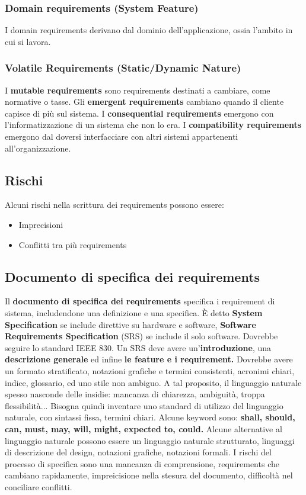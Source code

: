 \documentclass[11pt]{article}
\begin{document}
\subsubsection{Domain requirements (System Feature)}
I \gls{domain} requirements derivano dal dominio dell'applicazione, ossia l'ambito in cui si lavora. 
\subsubsection{Volatile Requirements (Static/Dynamic Nature)}
I \textbf{mutable requirements} sono requirements destinati a cambiare, come normative o tasse. Gli \textbf{emergent requirements} cambiano quando il cliente capisce di più sul sistema. I \textbf{consequential requirements} emergono con l'informatizzazione di un sistema che non lo era. I \textbf{compatibility requirements} emergono dal doversi interfacciare con altri sistemi appartenenti all'organizzazione. 
\subsection{Rischi}
Alcuni rischi nella scrittura dei requirements possono essere:
\begin{itemize}
    \item Imprecisioni
    \item Conflitti tra più requirements
\end{itemize}
\subsection{Documento di specifica dei requirements}
Il \textbf{documento di specifica dei requirements} specifica i requirement di sistema, includendone una definizione e una specifica. È detto \textbf{System Specification} se include direttive su hardware e software, \textbf{Software Requirements Specification} (SRS) se include il solo software. Dovrebbe seguire lo standard IEEE 830. Un SRS deve avere un'\textbf{introduzione}, una \textbf{descrizione generale} ed infine \textbf{le feature e i requirement.} Dovrebbe avere un formato stratificato, notazioni grafiche e termini consistenti, acronimi chiari, indice, glossario, ed uno stile non ambiguo. A tal proposito, il linguaggio naturale spesso nasconde delle insidie: mancanza di chiarezza, ambiguità, troppa flessibilità... Bisogna quindi inventare uno standard di utilizzo del linguaggio naturale, con sintassi fissa, termini chiari. Alcune keyword sono: \textbf{shall, should, can, must, may, will, might, expected to, could.} Alcune alternative al linguaggio naturale possono essere un linguaggio naturale strutturato, linguaggi di descrizione del design, notazioni grafiche, notazioni formali. I rischi del processo di specifica sono una mancanza di comprensione, requirements che cambiano rapidamente, impreicisione nella stesura del documento, difficoltà nel conciliare conflitti. 
\end{document}
